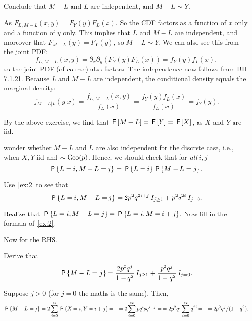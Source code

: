 \begin{exercise}
Conclude that $M-L$ and $L$ are independent, and $M-L\sim Y$.
\begin{solution}
As  $F_{L,M-L}(x,y) = F_Y(y) F_L(x)$. So the CDF factors as a function of $x$ only and a function of $y$ only. This implies that $L$ and $M-L$ are independent, and moreover that $F_{M-L}(y) =  F_Y(y)$, so $M-L \sim Y$. We can also see this from the joint PDF:
\begin{equation*}
f_{L, M-L}(x,y) = \partial_x \partial_y (F_Y(y) F_L(x)) = f_Y(y) f_L(x),
\end{equation*}
so the joint PDF (of course) also factors. The independence now follows from BH 7.1.21.
Because $L$ and $M-L$ are independent, the conditional density equals the marginal density:
\begin{equation*}
f_{M-L|L}(y|x) = \frac{f_{L, M-L}(x, y)}{f_L(x)} = \frac{f_Y(y) f_L(x)}{f_L(x)} = f_Y(y).
\end{equation*}
\end{solution}
\end{exercise}

By the  above exercise, we find that $\E{M-L} = \E Y = \E X$, as $X$ and $Y$ are iid.


 wonder whether $M-L$ and $L$ are also independent for the discrete case, i.e.,  when  $X, Y$ iid and $\sim \Geo{p}$.
Hence, we should check that for \emph{all} $i, j$
\begin{equation}\label{eq:34}
\P{L=i, M-L=j} = \P{L=i} \P{M-L=j}.
\end{equation}


\begin{exercise}
Use~\cref{ex:2} to see that
\begin{equation*}
\P{L=i, M-L=j} = 2p^2q^{2i+j} \1{j\geq 1} + p^2q^{2i}\1{j=0}.
\end{equation*}
\begin{hint}
Realize that $\P{L=i, M-L=j}=  \P{L=i, M=i+j}$. Now fill in the formala of~\cref{ex:2}.
\end{hint}
\end{exercise}

Now for the RHS.
\begin{exercise}
Derive that
\begin{equation*}
\P{M-L=j} = \frac{2p^2q^{j}}{1-q^2}\1{j\geq 1} + \frac{p^2q^{j}}{1-q^2}\1{j=0}.
\end{equation*}
\begin{solution}
Suppose $j>0$ (for $j=0$ the maths is the same). Then,
\begin{align*}
  \P{M-L=j}
&=2\sum_{i=0}^{\infty}\P{X =i, Y=i+j } =
&=2\sum_{i=0}^{\infty}p q^i pq^{i+j} =
&=2p^{2}q^{j}\sum_{i=0}^{\infty}q^{2i} =
&=2p^{2}q^{j}/(1-q^2).
\end{align*}
\end{solution}
\end{exercise}


